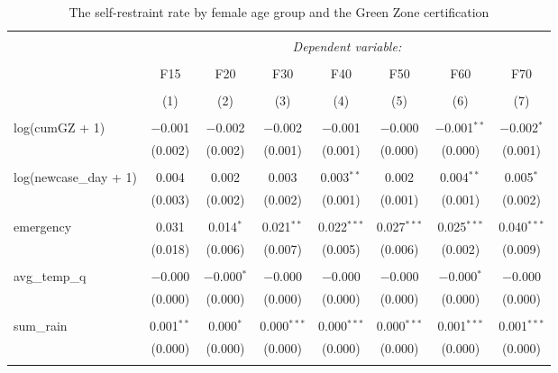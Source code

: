 
\begin{table}[!htbp] \centering 
  \caption{The self-restraint rate by female age group and the Green Zone certification} 
  \label{} 
\begin{tabular}{@{\extracolsep{5pt}}lccccccc} 
\\[-1.8ex]\hline 
\hline \\[-1.8ex] 
 & \multicolumn{7}{c}{\textit{Dependent variable:}} \\ 
\cline{2-8} 
\\[-1.8ex] & F15 & F20 & F30 & F40 & F50 & F60 & F70 \\ 
\\[-1.8ex] & (1) & (2) & (3) & (4) & (5) & (6) & (7)\\ 
\hline \\[-1.8ex] 
 log(cumGZ + 1) & $-$0.001 & $-$0.002 & $-$0.002 & $-$0.001 & $-$0.000 & $-$0.001$^{**}$ & $-$0.002$^{*}$ \\ 
  & (0.002) & (0.002) & (0.001) & (0.001) & (0.000) & (0.000) & (0.001) \\ 
  & & & & & & & \\ 
 log(newcase\_day + 1) & 0.004 & 0.002 & 0.003 & 0.003$^{**}$ & 0.002 & 0.004$^{**}$ & 0.005$^{*}$ \\ 
  & (0.003) & (0.002) & (0.002) & (0.001) & (0.001) & (0.001) & (0.002) \\ 
  & & & & & & & \\ 
 emergency & 0.031 & 0.014$^{*}$ & 0.021$^{**}$ & 0.022$^{***}$ & 0.027$^{***}$ & 0.025$^{***}$ & 0.040$^{***}$ \\ 
  & (0.018) & (0.006) & (0.007) & (0.005) & (0.006) & (0.002) & (0.009) \\ 
  & & & & & & & \\ 
 avg\_temp\_q & $-$0.000 & $-$0.000$^{*}$ & $-$0.000 & $-$0.000 & $-$0.000 & $-$0.000$^{*}$ & $-$0.000 \\ 
  & (0.000) & (0.000) & (0.000) & (0.000) & (0.000) & (0.000) & (0.000) \\ 
  & & & & & & & \\ 
 sum\_rain & 0.001$^{**}$ & 0.000$^{*}$ & 0.000$^{***}$ & 0.000$^{***}$ & 0.000$^{***}$ & 0.001$^{***}$ & 0.001$^{***}$ \\ 
  & (0.000) & (0.000) & (0.000) & (0.000) & (0.000) & (0.000) & (0.000) \\ 
  & & & & & & & \\ 

\end{tabular}
\end{table}

